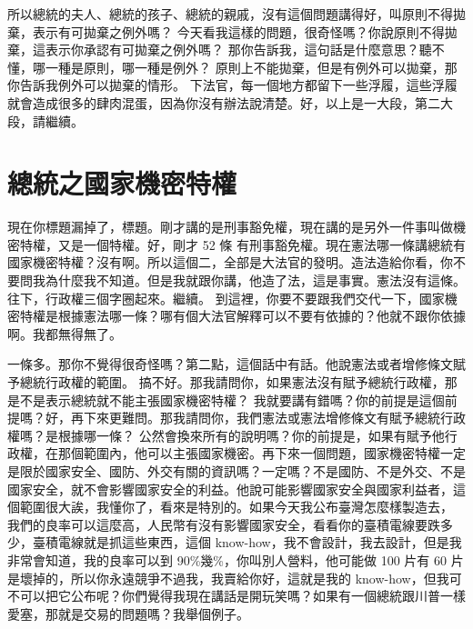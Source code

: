 \hypertarget{c11:cue:196}{}所以總統的夫人、總統的孩子、總統的親戚，沒有這個問題講得好，叫原則不得拋棄，表示有可拋棄之例外嗎？
\hypertarget{c11:cue:197}{}今天看我這樣的問題，很奇怪嗎？你說原則不得拋棄，這表示你承認有可拋棄之例外嗎？
\hypertarget{c11:cue:198}{}那你告訴我，這句話是什麼意思？聽不懂，哪一種是原則，哪一種是例外？
\hypertarget{c11:cue:199}{}原則上不能拋棄，但是有例外可以拋棄，那你告訴我例外可以拋棄的情形。
\hypertarget{c11:cue:200}{}下法官，每一個地方都留下一些浮履，這些浮履就會造成很多的肆肉混蛋，因為你沒有辦法說清楚。好，以上是一大段，第二大段，請繼續。

\section{總統之國家機密特權}

\hypertarget{c11:cue:201}{}現在你標題漏掉了，標題。剛才講的是刑事豁免權，現在講的是另外一件事叫做機密特權，又是一個特權。好，剛才 52 條
\hypertarget{c11:cue:202}{}有刑事豁免權。現在憲法哪一條講總統有國家機密特權？沒有啊。所以這個二，全部是大法官的發明。造法造給你看，你不要問我為什麼我不知道。但是我就跟你講，他造了法，這是事實。憲法沒有這條。往下，行政權三個字圈起來。繼續。
\hypertarget{c11:cue:203}{}到這裡，你要不要跟我們交代一下，國家機密特權是根據憲法哪一條？哪有個大法官解釋可以不要有依據的？他就不跟你依據啊。我都無得無了。

\hypertarget{c11:cue:204}{}一條多。那你不覺得很奇怪嗎？第二點，這個話中有話。他說憲法或者增修條文賦予總統行政權的範圍。
\hypertarget{c11:cue:205}{}搞不好。那我請問你，如果憲法沒有賦予總統行政權，那是不是表示總統就不能主張國家機密特權？
\hypertarget{c11:cue:206}{}我就要講有錯嗎？你的前提是這個前提嗎？好，再下來更難問。那我請問你，我們憲法或憲法增修條文有賦予總統行政權嗎？是根據哪一條？
\hypertarget{c11:cue:207}{}公然會換來所有的說明嗎？你的前提是，如果有賦予他行政權，在那個範圍內，他可以主張國家機密。再下來一個問題，國家機密特權一定是限於國家安全、國防、外交有關的資訊嗎？一定嗎？不是國防、不是外交、不是國家安全，就不會影響國家安全的利益。他說可能影響國家安全與國家利益者，這個範圍很大誒，我懂你了，看來是特別的。如果今天我公布臺灣怎麼樣製造去，
\hypertarget{c11:cue:208}{}我們的良率可以這麼高，人民幣有沒有影響國家安全，看看你的臺積電線要跌多少，臺積電線就是抓這些東西，這個 know-how，我不會設計，我去設計，但是我非常會知道，我的良率可以到 90\%幾\%，你叫別人營料，他可能做 100 片有 60 片是壞掉的，所以你永遠競爭不過我，我賣給你好，這就是我的 know-how，但我可不可以把它公布呢？你們覺得我現在講話是開玩笑嗎？如果有一個總統跟川普一樣愛塞，那就是交易的問題嗎？我舉個例子。

